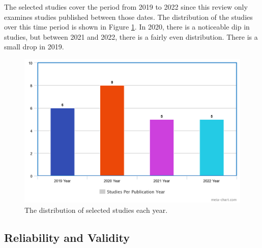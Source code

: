 \documentclass[a4paper,12pt]{article}
\begin{document}
The selected studies cover the period from 2019 to 2022 since this review only examines studies published between those dates. The distribution of the studies over this time period is shown in Figure \ref{fig:Distribution of selected studies}. In 2020, there is a noticeable dip in studies, but between 2021 and 2022, there is a fairly even distribution. There is a small drop in 2019.

\begin{figure}[H]
  \centering
  \includegraphics*[width=1.0\columnwidth]{img/Studies per Publication Year}
  \caption{The distribution of selected studies each year.}   
  \label{fig:Distribution of selected studies}
\end{figure}


\subsection{Reliability and Validity}
\label{sec:Reliability and Validity}
\end{document}
